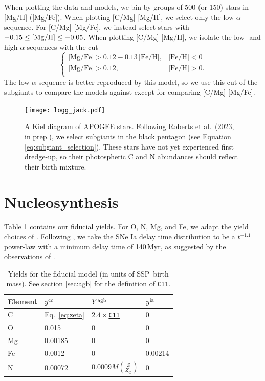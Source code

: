 \documentclass[fleqn,
usenatbib]{mnras}
\newcommand{\citetjack}{Roberts et al.~(2023, in prep.)}
\newcommand{\cxi}{\texttt{\hyperlink{C11}{C11}}}
\newcommand{\cfactor}{2.4}
\newcommand{\apogee}{APOGEE}
\newcommand{\ia}{SNe Ia}
\newcommand{\ssp}{SSP}
\newcommand{\caah}{[C/Mg]-[Mg/H]}
\newcommand{\caafe}{[C/Mg]-[Mg/Fe]}
\newcommand{\y}{Y}
\begin{document}
When plotting the data and models, we bin by groups of 500 (or 150) stars in [Mg/H] ([Mg/Fe]). When plotting \caah, we select only the low-$\alpha$ sequence. For \caafe, we instead select stars with $-0.15 \leq {\rm [Mg/H]} \leq -0.05$.  
When plotting \caah, we isolate the low- and high-$\alpha$ sequences with the cut
\begin{equation}\label{eq:high_alpha}
\begin{cases}
\text{[Mg/Fe]} >0.12-0.13\,\text{[Fe/H]}, & \text{[Fe/H]}<0\\
\text{[Mg/Fe]} >0.12, & \text{[Fe/H]}>0. \\
\end{cases}
\end{equation}
The low-$\alpha$ sequence is better reproduced by this model, so we use this cut of the subgiants to compare the models against except for comparing \caafe. 





\begin{figure}
    \centering
    \texttt{[image: logg\_jack.pdf]}
    \caption[]{
        A Kiel diagram of \apogee{} stars. Following \citetjack, we select subgiants in the black pentagon (see Equation \ref{eq:subgiant_selection}). These stars have not yet experienced first dredge-up, so their photospheric C and N abundances should reflect their birth mixture.
    }
    \label{fig:subgiant_selection}
\end{figure}






\section{Nucleosynthesis}
Table \ref{tab:fiducial_mod} contains our fiducial yields. 
For O, N, Mg, and Fe, we adapt the yield choices of \citet{james+21, james+23}.
Following \citet{james+21, james+23}, we take the \ia{} delay time distribution to be a $t^{-1.1}$ power-law with a minimum delay time of 140\,Myr, as suggested by the observations of \citet{maoz+12}.


\begin{table}
	\centering
    \caption[]{Yields for the fiducial model (in units of \ssp~birth mass). See section \ref{sec:agb} for the definition of \cxi.}
	\label{tab:fiducial_mod}

	\begin{tabular}{l l l l}
		\hline
        Element & $y^{\rm cc}$ & $\y^{\rm agb}$ & $y^{\rm ia}$ \\
		\hline
        C & Eq.~\ref{eq:zeta} & $\cfactor\times$\cxi &  0 \\
        O & 0.015 & 0 & 0 \\
        Mg & 0.00185 & 0 & 0 \\
        Fe & 0.0012 & 0 & 0.00214 \\
        N & 0.00072 & 0.0009$M\left(\frac{Z}{Z_\odot}\right)$ & 0\\
		\hline
	\end{tabular}
\end{table}
\end{document}
